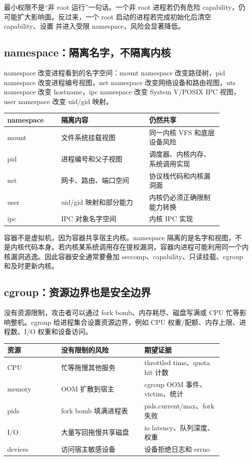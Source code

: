 最小权限不是“非 root 运行”一句话。一个非 root 进程若仍有危险 capability，仍可能扩大影响面。反过来，一个 root 启动的进程若完成初始化后清空 capability、设置  并进入受限 namespace，风险会显著降低。

\subsection{namespace：隔离名字，不隔离内核}

namespace 改变进程看到的名字空间：mount namespace 改变路径树，pid namespace 改变进程编号视图，net namespace 改变网络设备和路由视图，uts namespace 改变 hostname，ipc namespace 改变 System V/POSIX IPC 视图，user namespace 改变 uid/gid 映射。

\begin{longtable}{|p{0.22\linewidth}|p{0.36\linewidth}|p{0.3\linewidth}|}
\toprule
namespace & 隔离内容 & 仍然共享 \\
\midrule
mount & 文件系统挂载视图 & 同一内核 VFS 和底层设备风险 \\\tablerowrule
pid & 进程编号和父子视图 & 调度器、内核内存、系统调用实现 \\\tablerowrule
net & 网卡、路由、端口空间 & 协议栈代码和内核漏洞面 \\\tablerowrule
user & uid/gid 映射和部分能力 & 内核仍必须正确限制能力转换 \\\tablerowrule
ipc & IPC 对象名字空间 & 内核 IPC 实现 \\
\bottomrule
\end{longtable}

容器不是虚拟机，因为容器共享宿主内核。namespace 隔离的是名字和视图，不是内核代码本身。若内核某系统调用存在提权漏洞，容器内进程可能利用同一个内核漏洞逃逸。因此容器安全通常要叠加 seccomp、capability、只读挂载、cgroup 和及时更新内核。

\subsection{cgroup：资源边界也是安全边界}

没有资源限制，攻击者可以通过 fork bomb、内存耗尽、磁盘写满或 CPU 忙等影响整机。cgroup 给进程集合设置资源边界，例如 CPU 权重/配额、内存上限、进程数、I/O 权重和设备访问。

\begin{longtable}{|p{0.22\linewidth}|p{0.34\linewidth}|p{0.32\linewidth}|}
\toprule
资源 & 没有限制的风险 & 期望证据 \\
\midrule
CPU & 忙等拖慢其他服务 & throttled time、quota hit 计数 \\\tablerowrule
memory & OOM 扩散到宿主 & cgroup OOM 事件、victim、统计 \\\tablerowrule
pids & fork bomb 填满进程表 & pids.current/max、fork 失败 \\\tablerowrule
I/O & 大量写回拖慢共享磁盘 & io latency、队列深度、权重 \\\tablerowrule
devices & 访问宿主敏感设备 & 设备拒绝日志和 errno \\
\bottomrule
\end{longtable}

